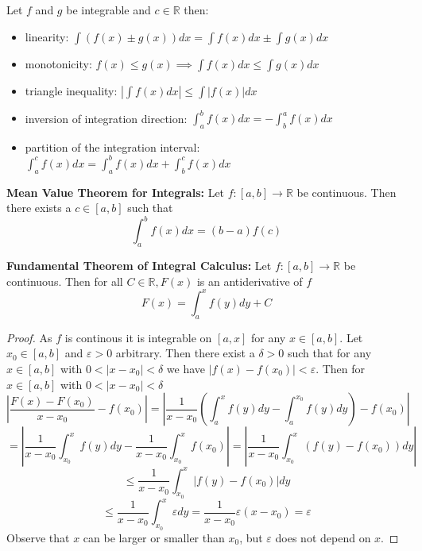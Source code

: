 \begin{theorem}
    Let $f$ and $g$ be integrable and $c \in \mathbb{R}$ then:
    \begin{itemize}
        \item linearity: $\int (f(x) \pm g(x))dx = \int f(x)dx \pm \int g(x)dx$
        \item monotonicity: $f(x) \leq g(x) \implies \int f(x)dx \leq \int g(x)dx$
        \item triangle inequality: $\left| \int f(x)dx \right| \leq \int |f(x)|dx$
        \item inversion of integration direction: $\int_{a}^{b} f(x)dx = -\int_{b}^{a} f(x)dx$
        \item partition of the integration interval: $\int_{a}^{c} f(x)dx = \int_{a}^{b} f(x)dx + \int_{b}^{c} f(x)dx$
    \end{itemize}    
\end{theorem}

\begin{theorem}
    \textbf{Mean Value Theorem for Integrals:}
    Let $f: [a,b] \to \mathbb{R}$ be continuous. Then there exists a $c \in [a,b]$ such that
    $$\int_{a}^{b} f(x)dx = (b-a)f(c)$$
\end{theorem}

\begin{theorem}
    \textbf{Fundamental Theorem of Integral Calculus:}
    Let $f: [a,b] \to \mathbb{R}$ be continuous. 
    Then for all $C \in \mathbb{R}, F(x)$ is an antiderivative of $f$
    $$F(x) = \int_{a}^{x} f(y)dy + C$$
\end{theorem}

\begin{proof}
    As $f$ is continous it is integrable on $[a,x]$ for any $x \in [a,b]$.
    Let $x_0 \in [a,b]$ and $\varepsilon > 0$ arbitrary. Then there exist a $\delta > 0$ such that for any $x \in [a,b]$ with $0 < |x-x_0| < \delta$ we have $|f(x) - f(x_0)| < \varepsilon$. 
    Then for $x \in [a,b]$ with $0 < |x-x_0| < \delta$
    $$\left| \frac{F(x)-F(x_0)}{x-x_0} - f(x_0) \right| = \left| \frac{1}{x-x_0} \left( \int_{a}^{x} f(y)dy -\int_{a}^{x_0} f(y)dy \right) - f(x_0) \right|$$
    $$= \left| \frac{1}{x-x_0} \int_{x_0}^{x} f(y)dy - \frac{1}{x-x_0} \int_{x_0}^{x} f(x_0) \right| = \left| \frac{1}{x-x_0} \int_{x_0}^{x} (f(y)-f(x_0)) dy \right|$$
    $$\leq \frac{1}{x-x_0} \int_{x_0}^{x} |f(y)-f(x_0)| dy$$
    $$\leq \frac{1}{x-x_0} \int_{x_0}^{x} \varepsilon dy = \frac{1}{x-x_0} \varepsilon (x-x_0) = \varepsilon$$
    Observe that $x$ can be larger or smaller than $x_0$, but $\varepsilon$ does not depend on $x$.
\end{proof}

